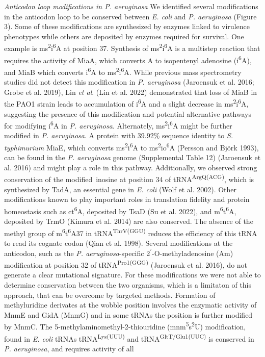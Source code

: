\documentclass[times, twoside]{zHenriquesLab-StyleBioRxiv}
\begin{document}
\textit{Anticodon loop modifications in P. aeruginosa} 
\newline
We identified several modifications in the anticodon loop to be conserved between \textit{E. coli} and \textit{P. aeruginosa }(Figure 3). Some of these modifications are synthesized by enzymes linked to virulence phenotypes while others are deposited by enzymes required for survival. One example is ms\textsuperscript{2}i\textsuperscript{6}A at position 37. Synthesis of ms\textsuperscript{2}i\textsuperscript{6}A is a multistep reaction that requires the activity of MiaA, which converts A to isopentenyl adenosine (i\textsuperscript{6}A), and MiaB which converts i\textsuperscript{6}A to ms\textsuperscript{2}i\textsuperscript{6}A. While previous mass spectrometry studies did not detect this modification in \textit{P. aeruginosa} (Jaroensuk et al. 2016; Grobe et al. 2019), Lin \textit{et al}. (Lin et al. 2022) demonstrated that loss of MiaB in the PAO1 strain leads to accumulation of i\textsuperscript{6}A and a slight decrease in ms\textsuperscript{2}i\textsuperscript{6}A, suggesting the presence of this modification and potential alternative pathways for modifying i\textsuperscript{6}A in \textit{P. aeruginosa}. Alternately, ms\textsuperscript{2}i\textsuperscript{6}A might be further modified in \textit{P. aeruginosa}. A protein with 39.92\% sequence identity to \textit{S. typhimurium }MiaE, which converts ms\textsuperscript{2}i\textsuperscript{6}A to ms\textsuperscript{2}io\textsuperscript{6}A (Persson and Björk 1993), can be found in the \textit{P. aeruginosa} genome (Supplemental Table 12) (Jaroensuk et al. 2016) and might play a role in this pathway. Additionally, we observed strong conservation of the modified inosine at position 34 of tRNA\textsuperscript{ArgQ(ACG)}, which is synthesized by TadA, an essential gene in \textit{E. coli} (Wolf et al. 2002). Other modifications known to play important roles in translation fidelity and protein homeostasis such as ct\textsuperscript{6}A, deposited by TsaD (Su et al. 2022), and m\textsuperscript{6}t\textsuperscript{6}A, deposited by TrmO (Kimura et al. 2014) are also conserved. The absence of the methyl group of m\textsuperscript{6}t\textsuperscript{6}A37 in tRNA\textsuperscript{ThrV}\textsuperscript{(GGU)} reduces the efficiency of this tRNA to read its cognate codon (Qian et al. 1998). Several modifications at the anticodon, such as the \textit{P. aeruginosa}-specific 2\(^{\prime}\)-O-methyladenosine (Am) modification at position 32 of tRNA\textsuperscript{Pro1(GGG)} (Jaroensuk et al. 2016), do not generate a clear mutational signature. For these modifications we were not able to determine conservation between the two organisms, which is a limitaton of this approach, that can be overcome by targeted methods. Formation of methyluridine derivates at the wobble position involves the enzymatic activity of MnmE and GidA (MnmG) and in some tRNAs the position is further modified by MnmC. The 5-methylaminomethyl-2-thiouridine (mnm\textsuperscript{5}s\textsuperscript{2}U) modification, found in \textit{E. coli} tRNAs tRNA\textsuperscript{Lys}\textsuperscript{(}\textsuperscript{UUU)} and tRNA\textsuperscript{GltT}\textsuperscript{/Glu1(UUC)} is conserved in \textit{P. aeruginosa}, and requires activity of all 
\end{document}

